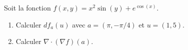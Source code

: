 
\begin{exercice}\label{exoOutilsMath-0131}

    Soit la fonction \( f(x,y)=x^2\sin(y)+ e^{\cos(x)}\).
    \begin{enumerate}
        \item
            Calculer \( df_a(u)\) avec \( a=(\pi,-\pi/4)\) et \( u=(1,5)\).
        \item
            Calculer \( \nabla\cdot(\nabla f)(a)\).
    \end{enumerate}

\end{exercice}

